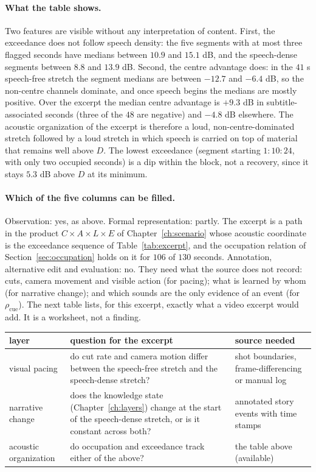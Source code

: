 \paragraph{What the table shows.} Two features are visible without any interpretation of content. First, the exceedance does not follow speech density: the five segments with at most three flagged seconds have medians between $10.9$ and $15.1$ dB, and the speech-dense segments between $8.8$ and $13.9$ dB. Second, the centre advantage does: in the $41$ s speech-free stretch the segment medians are between $-12.7$ and $-6.4$ dB, so the non-centre channels dominate, and once speech begins the medians are mostly positive. Over the excerpt the median centre advantage is $+9.3$ dB in subtitle-associated seconds (three of the $48$ are negative) and $-4.8$ dB elsewhere. The acoustic organization of the excerpt is therefore a loud, non-centre-dominated stretch followed by a loud stretch in which speech is carried on top of material that remains well above $D$. The lowest exceedance (segment starting $1{:}10{:}24$, with only two occupied seconds) is a dip within the block, not a recovery, since it stays $5.3$ dB above $D$ at its minimum.

\paragraph{Which of the five columns can be filled.} Observation: yes, as above. Formal representation: partly. The excerpt is a path in the product $C\times A\times L\times E$ of Chapter~\ref{ch:scenario} whose acoustic coordinate is the exceedance sequence of Table~\ref{tab:excerpt}, and the occupation relation of Section~\ref{sec:occupation} holds on it for $106$ of $130$ seconds. Annotation, alternative edit and evaluation: no. They need what the source does not record: cuts, camera movement and visible action (for pacing); what is learned by whom (for narrative change); and which sounds are the only evidence of an event (for $\rho_{\mathrm{cue}}$). The next table lists, for this excerpt, exactly what a video excerpt would add. It is a worksheet, not a finding.

\begin{center}
\small
\begin{tabular}{p{3.6cm}p{4.2cm}p{4.2cm}}
\toprule
layer & question for the excerpt & source needed\\
\midrule
visual pacing & do cut rate and camera motion differ between the speech-free stretch and the speech-dense stretch? & shot boundaries, frame-differencing or manual log\\
narrative change & does the knowledge state (Chapter~\ref{ch:layers}) change at the start of the speech-dense stretch, or is it constant across both? & annotated story events with time stamps\\
acoustic organization & do occupation and exceedance track either of the above? & the table above (available)\\
\bottomrule
\end{tabular}
\end{center}

